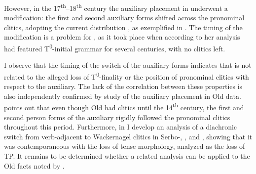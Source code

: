 \documentclass[output=paper,modfonts,newtxmath,hidelinks]{langscibook}
\begin{document}
\ea \label{11:ex12}
	\label{11:ex12a}
	\label{11:ex12b}
	\z
\z
However, in the 17\textsuperscript{th}--18\textsuperscript{th} century the auxiliary placement in  underwent a modification: the first and second auxiliary forms shifted across the pronominal clitics, adopting the current distribution \citep[76--77]{slawski1946}, as exemplified in . The timing of the modification is a problem for \citet{pancheva2005}, as it took place when according to her analysis  had featured T\textsuperscript{0}{}-initial grammar for several centuries, with no  clitics left.

\ea \label{11:ex13}
	\label{11:ex13a}
	\label{11:ex13b}
 	\z
 \z
I observe that the timing of the switch of the auxiliary forms indicates that  is not related to the alleged loss of T\textsuperscript{0}{}-finality or the position of pronominal clitics with respect to the auxiliary. The lack of the correlation between these properties is also independently confirmed by  study of the auxiliary placement in Old  data. \citeauthor{jung2015} points out that even though Old  had  clitics until the 14\textsuperscript{th} century, the first and second person forms of the auxiliary rigidly followed the pronominal clitics throughout this period. Furthermore, in \citet{migdalski2015,migdalski2016} I develop an analysis of a diachronic switch from verb-adjacent to Wackernagel clitics in Serbo-, , and , showing that it was contemporaneous with the loss of tense morphology, analyzed as the loss of TP. It remains to be determined whether a related analysis can be applied to the Old  facts noted by \citet{pancheva2005}.
\end{document}
